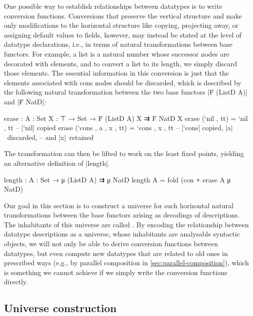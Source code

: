 One possible way to establish relationships between datatypes is to write conversion functions.
Conversions that preserve the vertical structure and make only modifications to the horizontal structure like copying, projecting away, or assigning default values to fields, however, may instead be stated at the level of datatype declarations, i.e., in terms of natural transformations between base functors.
For example, a list is a natural number whose successor nodes are decorated with elements, and to convert a list to its length, we simply discard those elements.
The essential information in this conversion is just that the elements associated with cons nodes should be discarded, which is described by the following natural transformation between the two base functors |Ḟ (ListD A)| and |Ḟ NatD|:
\begin{code}
erase : {A : Set} {X : ⊤ → Set} → Ḟ (ListD A) X ⇉ Ḟ NatD X
erase (`nil   ,          tt)  =  `nil   ,       tt  -- |`nil| copied
erase (`cons  , a , x ,  tt)  =  `cons  ,  x ,  tt   -- |`cons| copied, |a|~discarded,
                                                     -- and |x|~retained
\end{code}
The transformation can then be lifted to work on the least fixed points, yielding an alternative definition of |length|.
\begin{code}
length : {A : Set} → μ (ListD A) ⇉ μ NatD
length {A} = fold (con ∘ erase {A} {μ NatD})
\end{code}
Our goal in this section is to construct a universe for such horizontal natural transformations between the base functors arising as decodings of descriptions.
The inhabitants of this universe are called .
By encoding the relationship between datatype descriptions as a universe, whose inhabitants are analysable syntactic objects, we will not only be able to derive conversion functions between datatypes, but even compute new datatypes that are related to old ones in prescribed ways (e.g., by parallel composition in \autoref{sec:parallel-composition}), which is something we cannot achieve if we simply write the conversion functions directly.

\subsection{Universe construction}

